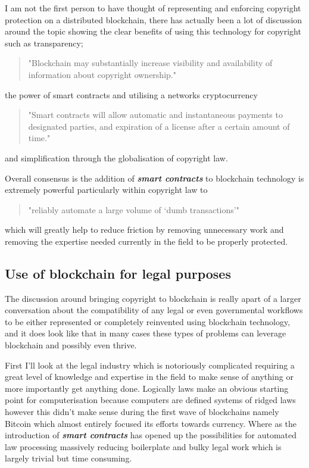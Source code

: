 \documentclass[12pt]{report}
\newcommand{\keyword}[1]{\textbf{\textit{#1}}}
\begin{document}
I am not the first person to have thought of representing and enforcing copyright protection on a distributed blockchain, there has actually been a lot of discussion around the topic showing the clear benefits of using this technology for copyright such as transparency; \begin{quote} "Blockchain may substantially increase visibility and availability of information about copyright ownership." \cite{Copyright_in_the_blockchain_era} \end{quote} the power of smart contracts and utilising a networks cryptocurrency \begin{quote} "Smart contracts will allow automatic and instantaneous payments to designated parties, and expiration of a license after a certain amount of time." \cite{Copyright_in_the_blockchain_era} \end{quote} and simplification through the globalisation of copyright law.

Overall consensus is the addition of \keyword{smart contracts} to blockchain technology is extremely powerful particularly within copyright law to \begin{quote}"reliably automate a large volume of ‘dumb transactions’" \cite{missing_link_in_copyright_licensing}\end{quote} which will greatly help to reduce friction by removing unnecessary work and removing the expertise needed currently in the field to be properly protected.

\subsection{Use of blockchain for legal purposes}

The discussion around bringing copyright to blockchain is really apart of a larger conversation about the compatibility of any legal or even governmental workflows to be either represented or completely reinvented using blockchain technology, and it does look like that in many cases these types of problems can leverage blockchain and possibly even thrive.

First I'll look at the legal industry which is notoriously complicated requiring a great level of knowledge and expertise in the field to make sense of anything or more importantly get anything done. Logically laws make an obvious starting point for computerisation because computers are defined systems of ridged laws however this didn't make sense during the first wave of blockchains namely Bitcoin which almost entirely focused its efforts towards currency. Where as the introduction of \keyword{smart contracts} has opened up the possibilities for automated law processing massively reducing boilerplate and bulky legal work which is largely trivial but time consuming.
\end{document}
